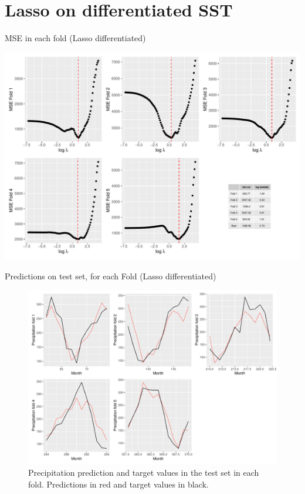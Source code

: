 \documentclass[
  ignorenonframetext,
]{beamer}
\begin{document}
\hypertarget{lasso-on-differentiated-sst}{%
\section{Lasso on differentiated
SST}\label{lasso-on-differentiated-sst}}

\begin{frame}{MSE in each fold (Lasso differentiated)}
\protect\hypertarget{mse-in-each-fold-lasso-differentiated}{}
\begin{center}\includegraphics[width=0.75\linewidth]{ma-presentation_files/figure-beamer/unnamed-chunk-38-1} \end{center}
\end{frame}

\begin{frame}{Predictions on test set, for each Fold (Lasso
differentiated)}
\protect\hypertarget{predictions-on-test-set-for-each-fold-lasso-differentiated}{}
\begin{figure}

{\centering \includegraphics[width=0.75\linewidth]{ma-presentation_files/figure-beamer/pred-plot-fold-lasso-diff-1} 

}

\caption{Precipitation prediction and target values in the test set in each fold. Predictions in red and target values in black.}\label{fig:pred-plot-fold-lasso-diff}
\end{figure}
\end{frame}
\end{document}
